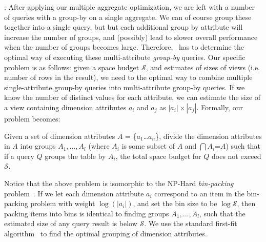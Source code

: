 :
After applying our multiple aggregate optimization, we are left with a number of 
queries with a group-by on a single aggregate.
We can of course group these together into a single query, but but each additional 
group by attribute will increase the number of groups, and (possibly) lead to slower
overall performance when the number of groups becomes large.  
Therefore, \SeeDB\ has to determine the optimal way of executing these multi-attribute
{\it group-by} queries.
Our specific problem is as follows: given a space budget $\mathcal{S}$,
and estimates of sizes of views (i.e. number of rows in the result), we need to the optimal
way to combine multiple single-attribute group-by queries into multi-attribute group-by queries.
If we know the number of distinct values for each attribute, we can estimate the
size of a view containing dimension attributes $a_i$ and $a_j$ as $|a_i|\times |a_j|$.
Formally, our problem becomes:
\vspace{-5pt}
\begin{problem}
Given a set of dimension attributes $A$ = \{$a_1$\ldots$a_n$\}, divide the
dimension attributes in $A$ into groups $A_1, \ldots, A_l$ (where $A_i$ is some
subset of $A$ and $\bigcap A_i$=$A$) such that if a query $Q$ groups the table by $A_i$, 
the total space budget for $Q$ does not exceed $\mathcal{S}$.
\vspace{-5pt}
\end{problem}

Notice that the above problem is isomorphic to the NP-Hard {\em bin-packing} problem~\cite{garey}.
If we let each dimension attribute
$a_i$ correspond to an item in the bin-packing problem with weight $\log (|a_i|)$,
and set the bin size to be $\log \mathcal{S}$,
then packing items into bins is identical to finding groups $A_1, \ldots, A_l$,
such that the estimated size of any query result is below $\mathcal{S}$.
We use the standard first-fit algorithm~\cite{first-fit} to find the optimal
grouping of dimension attributes.



